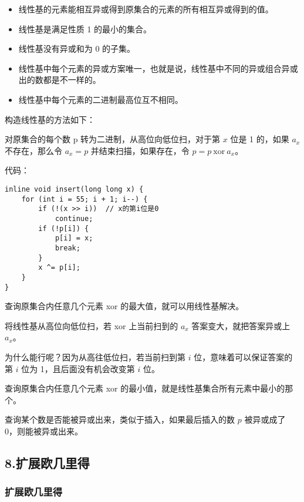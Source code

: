 \documentclass[]{article}
\begin{document}
\begin{itemize}
\item
  线性基的元素能相互异或得到原集合的元素的所有相互异或得到的值。
\item
  线性基是满足性质 1 的最小的集合。
\item
  线性基没有异或和为 0 的子集。
\item
  线性基中每个元素的异或方案唯一，也就是说，线性基中不同的异或组合异或出的数都是不一样的。
\item
  线性基中每个元素的二进制最高位互不相同。
\end{itemize}

构造线性基的方法如下：

对原集合的每个数 p 转为二进制，从高位向低位扫，对于第 \(x\) 位是 1
的，如果 \(a_x\) 不存在，那么令 \(a_x=p\) 并结束扫描，如果存在，令
\(p=p~\text{xor}~a_x\)。

代码：

\begin{verbatim}
inline void insert(long long x) {
    for (int i = 55; i + 1; i--) {
        if (!(x >> i))  // x的第i位是0
            continue;
        if (!p[i]) {
            p[i] = x;
            break;
        }
        x ^= p[i];
    }
}
\end{verbatim}

查询原集合内任意几个元素 xor 的最大值，就可以用线性基解决。

将线性基从高位向低位扫，若 xor 上当前扫到的 \(a_x\)
答案变大，就把答案异或上 \(a_x\)。

为什么能行呢？因为从高往低位扫，若当前扫到第 \(i\)
位，意味着可以保证答案的第 \(i\) 位为 1，且后面没有机会改变第 \(i\) 位。

查询原集合内任意几个元素 xor
的最小值，就是线性基集合所有元素中最小的那个。

查询某个数是否能被异或出来，类似于插入，如果最后插入的数 \(p\)
被异或成了 0，则能被异或出来。

\hypertarget{ux6269ux5c55ux6b27ux51e0ux91ccux5f97}{%
\subsection{8.扩展欧几里得}\label{ux6269ux5c55ux6b27ux51e0ux91ccux5f97}}

\hypertarget{ux6269ux5c55ux6b27ux51e0ux91ccux5f97-1}{%
\subsubsection{扩展欧几里得}\label{ux6269ux5c55ux6b27ux51e0ux91ccux5f97-1}}
\end{document}
